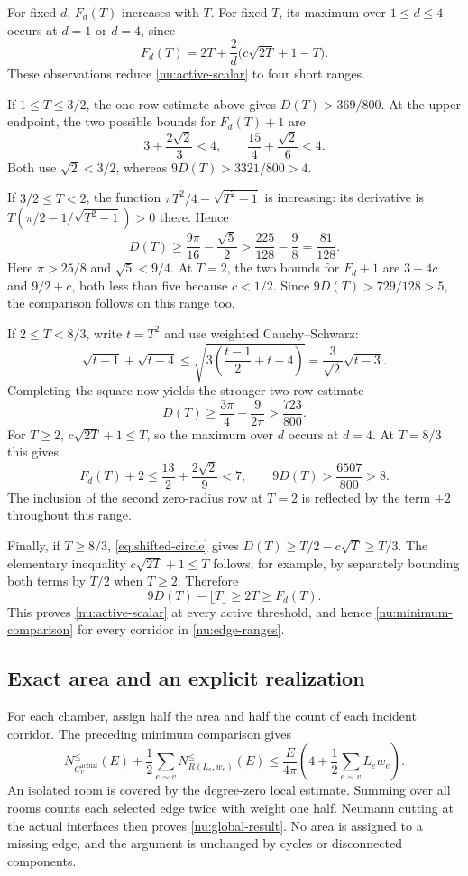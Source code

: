 \documentclass[11pt,reqno]{amsart}
\numberwithin{equation}{section}
\begin{document}
For fixed $d$, $F_d(T)$ increases with $T$. For fixed $T$, its maximum
over $1\le d\le4$ occurs at $d=1$ or $d=4$, since
\[
 F_d(T)=2T+\frac2d\bigl(c\sqrt{2T}+1-T\bigr).
\]
These observations reduce \eqref{nu:active-scalar} to four short ranges.

If $1\le T\le3/2$, the one-row estimate above gives
$D(T)>369/800$. At the upper endpoint, the two possible bounds for
$F_d(T)+1$ are
\[
 3+\frac{2\sqrt2}{3}<4,
 \qquad \frac{15}{4}+\frac{\sqrt2}{6}<4.
\]
Both use $\sqrt2<3/2$, whereas $9D(T)>3321/800>4$.

If $3/2\le T<2$, the function
$\pi T^2/4-\sqrt{T^2-1}$ is increasing: its derivative is
$T(\pi/2-1/\sqrt{T^2-1})>0$ there. Hence
\[
 D(T)\ge\frac{9\pi}{16}-\frac{\sqrt5}{2}
 >\frac{225}{128}-\frac98=\frac{81}{128}.
\]
Here $\pi>25/8$ and $\sqrt5<9/4$. At $T=2$, the two bounds for
$F_d+1$ are $3+4c$ and $9/2+c$, both less than five because $c<1/2$.
Since $9D(T)>729/128>5$, the comparison follows on this range too.

If $2\le T<8/3$, write $t=T^2$ and use weighted Cauchy--Schwarz:
\[
 \sqrt{t-1}+\sqrt{t-4}
 \le\sqrt{3\left(\frac{t-1}{2}+t-4\right)}
 =\frac3{\sqrt2}\sqrt{t-3}.
\]
Completing the square now yields the stronger two-row estimate
\[
 D(T)\ge\frac{3\pi}{4}-\frac9{2\pi}
 >\frac{723}{800}.
\]
For $T\ge2$, $c\sqrt{2T}+1\le T$, so the maximum over $d$ occurs
at $d=4$. At $T=8/3$ this gives
\[
 F_d(T)+2\le\frac{13}{2}+\frac{2\sqrt2}{9}<7,
 \qquad 9D(T)>\frac{6507}{800}>8.
\]
The inclusion of the second zero-radius row at $T=2$ is reflected by
the term $+2$ throughout this range.

Finally, if $T\ge8/3$, \eqref{eq:shifted-circle} gives
$D(T)\ge T/2-c\sqrt T\ge T/3$. The elementary inequality
$c\sqrt{2T}+1\le T$ follows, for example, by separately bounding
both terms by $T/2$ when $T\ge2$. Therefore
\[
 9D(T)-\lfloor T\rfloor\ge2T\ge F_d(T).
\]
This proves \eqref{nu:active-scalar} at every active threshold, and
hence \eqref{nu:minimum-comparison} for every corridor in
\eqref{nu:edge-ranges}.

\subsection{Exact area and an explicit realization}

For each chamber, assign half the area and half the count of each
incident corridor. The preceding minimum comparison gives
\[
 N_{C_v^{\mathrm{actual}}}^{\le}(E)
 +\frac12\sum_{e\sim v}N_{R(L_e,w_e)}^{\le}(E)
 \le\frac{E}{4\pi}
       \left(4+\frac12\sum_{e\sim v}L_ew_e\right).
\]
An isolated room is covered by the degree-zero local estimate. Summing
over all rooms counts each selected edge twice with weight one half.
Neumann cutting at the actual interfaces then proves
\eqref{nu:global-result}. No area is assigned to a missing edge, and
the argument is unchanged by cycles or disconnected components.
\end{document}
